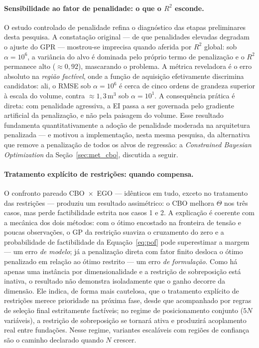 \paragraph{Sensibilidade ao fator de penalidade: o que o $R^2$ esconde.}
O estudo controlado de penalidade refina o diagnóstico das etapas preliminares desta pesquisa. A constatação original — de que penalidades elevadas degradam o ajuste do GPR — mostrou-se imprecisa quando aferida por $R^2$ global: sob $\alpha = 10^{6}$, a variância do alvo é dominada pelo próprio termo de penalização e o $R^2$ permanece alto ($\approx 0{,}92$), mascarando o problema. A métrica reveladora é o erro absoluto na \textit{região factível}, onde a função de aquisição efetivamente discrimina candidatos: ali, o RMSE sob $\alpha = 10^{6}$ é cerca de cinco ordens de grandeza superior à escala do volume, contra $\approx 1{,}3\,\si{\meter\cubed}$ sob $\alpha = 10^{1}$. A consequência prática é direta: com penalidade agressiva, a EI passa a ser governada pelo gradiente artificial da penalização, e não pela paisagem do volume. Esse resultado fundamenta quantitativamente a adoção de penalidade moderada na arquitetura penalizada — e motivou a implementação, nesta mesma pesquisa, da alternativa que remove a penalização de todos os alvos de regressão: a \textit{Constrained Bayesian Optimization} da Seção~\ref{sec:met_cbo}, discutida a seguir.

\paragraph{Tratamento explícito de restrições: quando compensa.}
O confronto pareado CBO~$\times$~EGO — idênticos em tudo, exceto no tratamento das restrições — produziu um resultado assimétrico: o CBO melhora $\Theta$ nos três casos, mas perde factibilidade estrita nos casos 1 e 2. A explicação é coerente com a mecânica dos dois métodos: com o ótimo encostado na fronteira de tensão e poucas observações, o GP da restrição suaviza o cruzamento do zero e a probabilidade de factibilidade da Equação~\eqref{eq:pof} pode superestimar a margem — um erro \textit{de modelo}; já a penalização direta com fator finito desloca o ótimo penalizado em relação ao ótimo restrito — um erro \textit{de formulação}. Como há apenas uma instância por dimensionalidade e a restrição de sobreposição está inativa, o resultado não demonstra isoladamente que o ganho decorre da dimensão. Ele indica, de forma mais cautelosa, que o tratamento explícito de restrições merece prioridade na próxima fase, desde que acompanhado por regras de seleção final estritamente factíveis; no regime de posicionamento conjunto ($5N$ variáveis), a restrição de sobreposição se tornará ativa e produzirá acoplamento real entre fundações. Nesse regime, variantes escaláveis com regiões de confiança  são o caminho declarado quando $N$ crescer.

